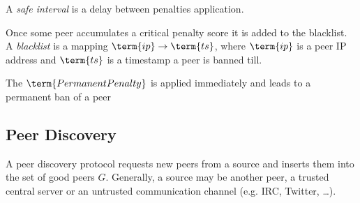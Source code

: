 A \emph{safe interval} is a delay between penalties application.

Once some peer accumulates a critical penalty score it is added to the blacklist.
A \emph{blacklist} is a mapping $\term{ip} \rightarrow \term{ts}$, where $\term{ip}$ is a peer IP address
and $\term{ts}$ is a timestamp a peer is banned till.

The $\term{PermanentPenalty}$ is applied immediately and leads to a permanent ban of a peer

\subsection{Peer Discovery}\label{subsec:peer-discovery}

A peer discovery protocol requests new peers from a source and inserts them into
the set of good peers $G$.
Generally, a source may be another peer, a trusted central server or an untrusted communication
channel (e.g. IRC, Twitter, \ldots).
